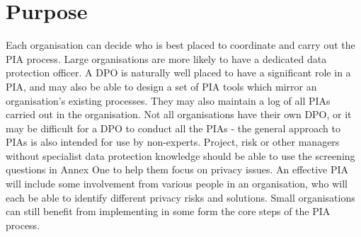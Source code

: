 \documentclass{article}
\begin{document}
\section{Purpose}
Each organisation can decide who is best placed to coordinate and carry out the PIA process. Large organisations are more likely to have a dedicated data protection officer. A DPO is naturally well placed to have a significant role in a PIA, and may also be able to design a set of PIA tools which mirror an organisation’s existing processes. They may also maintain a log of all PIAs carried out in the organisation. Not all organisations have their own DPO, or it may be difficult for a DPO to conduct all the PIAs - the general approach to PIAs is also intended for use by non-experts. Project, risk or other managers without specialist data protection knowledge should be able to use the screening questions in Annex One to help them focus on privacy issues. An effective PIA will include some involvement from various people in an organisation, who will each be able to identify different privacy risks and solutions. Small organisations can still benefit from implementing in some form the core steps of the PIA process.
\end{document}
